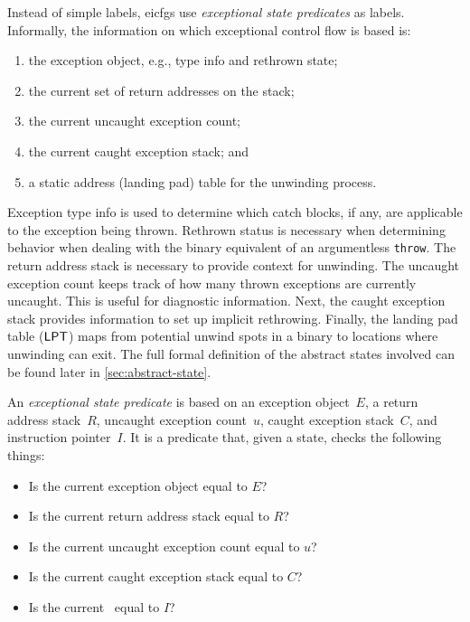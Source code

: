 Instead of simple labels, \acp{eicfg} use \emph{exceptional state predicates} as labels.
Informally, the information on which exceptional control flow is based is:
\begin{enumerate}
  \item the exception object, e.g., type info and rethrown state;
  \item the current set of return addresses on the stack;
  \item the current uncaught exception count;
  \item the current caught exception stack; and
  \item a static address (landing pad) table for the unwinding process.
\end{enumerate}
Exception type info is used to determine which catch blocks, if any, are applicable to the exception being thrown.
Rethrown status is necessary when determining behavior when dealing with the binary equivalent of an argumentless \lstinline|throw|.
The return address stack is necessary to provide context for unwinding.
The uncaught exception count keeps track of how many thrown exceptions are currently uncaught.
This is useful for diagnostic information.
Next, the caught exception stack provides information to set up implicit rethrowing.
Finally, the landing pad table ($\operatorname{\mathsf{LPT}}$) maps from potential unwind spots in a binary to locations where unwinding can exit.
The full formal definition of the abstract states involved can be found later in \cref{sec:abstract-state}.

\begin{definition}
  An \emph{exceptional state predicate} is based on an exception object~$E$, a return address stack~$R$, uncaught exception count~$u$, caught exception stack~$C$, and instruction pointer~$I$.
  It is a predicate that, given a state, checks the following things:
  \begin{itemize}
    \item Is the current exception object equal to $E$?
    \item Is the current return address stack equal to $R$?
    \item Is the current uncaught exception count equal to $u$?
    \item Is the current caught exception stack equal to $C$?
    \item Is the current \rip\ equal to $I$?
  \end{itemize}
\end{definition}

